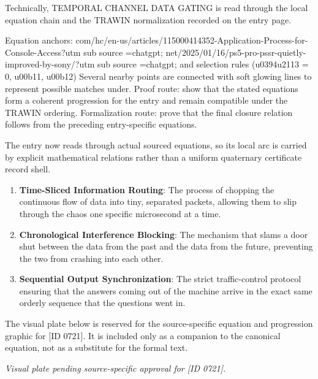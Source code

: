 Technically, TEMPORAL CHANNEL DATA GATING is read through the local equation chain and the TRAWIN normalization recorded on the entry page.

Equation anchors: com/hc/en-us/articles/115000414352-Application-Process-for-Console-Access?utm sub source =chatgpt; net/2025/01/16/ps5-pro-pssr-quietly-improved-by-sony/?utm sub source =chatgpt; and selection rules (u0394u2113 = 0, u00b11, u00b12) Several nearby points are connected with soft glowing lines to represent possible matches under. Proof route: show that the stated equations form a coherent progression for the entry and remain compatible under the TRAWIN ordering. Formalization route: prove that the final closure relation follows from the preceding entry-specific equations.

The entry now reads through actual sourced equations, so its local arc is carried by explicit mathematical relations rather than a uniform quaternary certificate record shell.
\endgroup

\begin{enumerate}[leftmargin=1.6em,itemsep=6pt,topsep=4pt]
\item \textbf{Time-Sliced Information Routing}: The process of chopping the continuous flow of data into tiny, separated packets, allowing them to slip through the chaos one specific microsecond at a time.
\item \textbf{Chronological Interference Blocking}: The mechanism that slams a door shut between the data from the past and the data from the future, preventing the two from crashing into each other.
\item \textbf{Sequential Output Synchronization}: The strict traffic-control protocol ensuring that the answers coming out of the machine arrive in the exact same orderly sequence that the questions went in.
\end{enumerate}

\begingroup\footnotesize\sloppy
The visual plate below is reserved for the source-specific equation and progression graphic for [ID 0721]. It is included only as a companion to the canonical equation, not as a substitute for the formal text.
\par\endgroup
\begingroup\footnotesize\itshape
Visual plate pending source-specific approval for [ID 0721].
\par\endgroup

